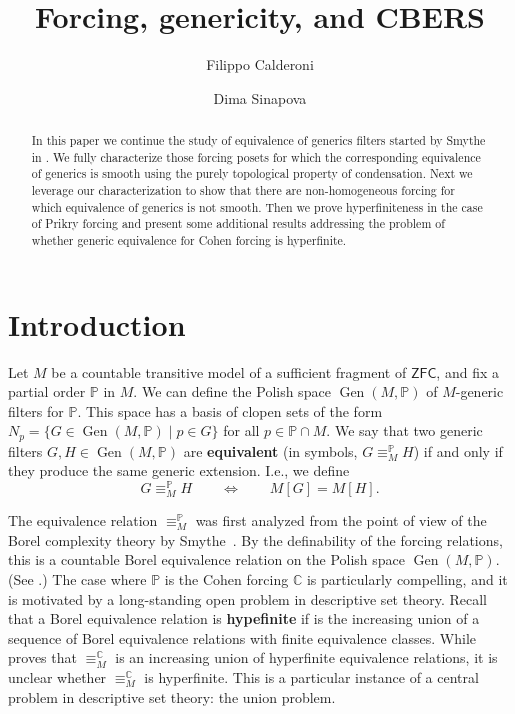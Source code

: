\documentclass{amsart}
\title{Forcing, genericity, and CBERS}
\author[F.~Calderoni]{Filippo Calderoni}
\author[D.~Sinapova]{Dima Sinapova}
\newcommand{\markdef}[1]{\textbf{#1}}
\newcommand{\Gen}{\operatorname{Gen}}
\theoremstyle{definition}
\theoremstyle{remark}
\begin{document}
\maketitle

\begin{abstract}
    In this paper we continue the study of equivalence of generics filters started by Smythe in \cite{Smy22}. We fully characterize those forcing posets for which the corresponding equivalence of generics is smooth using the purely topological property of condensation. Next we leverage our characterization to show that there are non-homogeneous forcing for which equivalence of generics is not smooth. Then we prove hyperfiniteness in the case of Prikry forcing and present some additional results addressing the problem of whether generic equivalence for Cohen forcing is hyperfinite.
\end{abstract}

\section{Introduction}

Let \(M\) be a countable transitive model of a sufficient fragment of \(\textsf{ZFC}\), and fix a partial order
\(\mathbb{P}\) in \(M\).
We can define the Polish space $\Gen(M, \mathbb{P})$ of $M$-generic filters for $\mathbb{P}$.  This space has a basis of clopen sets of the form $N_p=\{G\in \Gen(M, \mathbb{P})\mid p\in G\}$ for all $p\in \mathbb{P}\cap M$.
We say that two generic filters \(G,H\in \Gen(M, \mathbb{P})\)
are \markdef{equivalent} (in symbols, \(G \equiv_{M}^\mathbb{P} H\)) if and only if they produce the same generic extension. I.e., we define
\[
G \equiv_{M}^\mathbb{P} H\qquad \iff\qquad M[G]=M[H].
\]

The equivalence relation \(\equiv_{M}^\mathbb{P}\) was first analyzed from the point of view of the Borel complexity theory by Smythe~\cite{Smy22}.
By the definability of the forcing relations, this is a countable Borel equivalence relation on the Polish space $\Gen(M, \mathbb{P})$. (See \cite[Lemma~2.6]{Smy22}.)
The case where \(\mathbb{P}\) is the Cohen forcing \(\mathbb{C}\) is particularly compelling, and it is motivated by a long-standing open problem in descriptive set theory. Recall that a Borel equivalence relation is \markdef{hypefinite} if is the increasing union of a sequence of Borel equivalence relations with finite equivalence classes.
While \cite[Theorem~3.1]{Smy22} proves that \(\equiv_{M}^\mathbb{C}\) is an increasing union of hyperfinite equivalence relations, it is unclear whether \(\equiv_{M}^\mathbb{C}\) is hyperfinite.
This is a particular instance of a central problem in descriptive set theory: the union problem.
\end{document}
